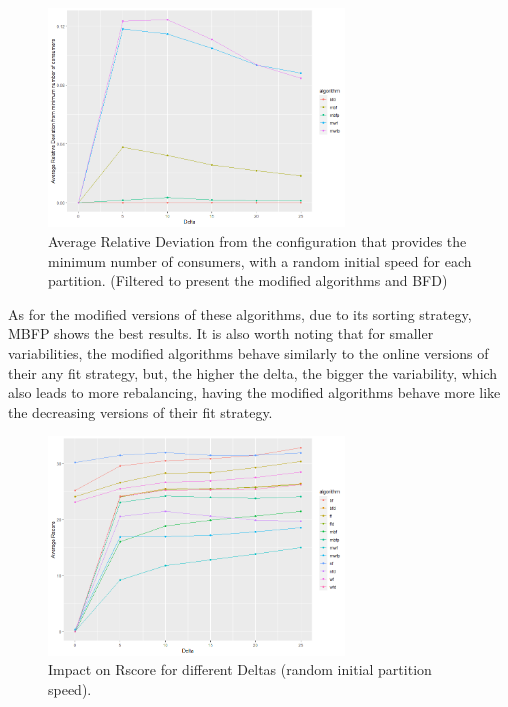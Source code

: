 \begin{figure}[H]
    \centering
    \includegraphics[width=0.7\textwidth]{images/Relative Number of Consumer Modified.png}
\caption{Average Relative Deviation from the configuration that provides the minimum number of consumers, with a random initial speed for each partition. (Filtered to present the modified algorithms and BFD)}
\label{fig:relative_nconsumers_modified}
\end{figure}

As for the modified versions of these algorithms, due to its sorting strategy, MBFP shows the best results. It is also worth noting that for smaller variabilities, the modified algorithms behave similarly to the online versions of their any fit strategy, but, the higher the delta, the bigger the variability, which also leads to more rebalancing, having the modified algorithms behave more like the decreasing versions of their fit strategy.

\begin{figure}[H]
    \centering
    \includegraphics[width=0.7\textwidth]{images/Rscore.png}
\caption{Impact on Rscore for different Deltas (random initial partition speed).}
\label{fig:rscore}
\end{figure}

